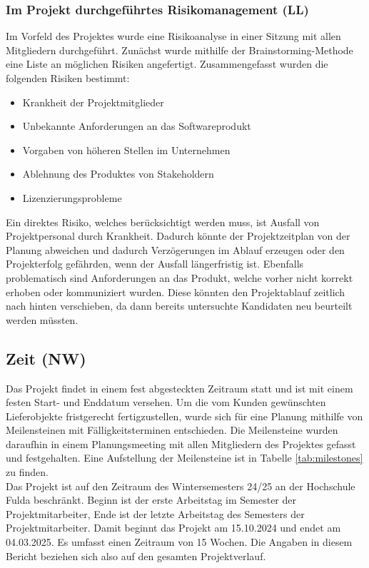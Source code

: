 \documentclass[ThesisDJ.tex]{subfiles}
\begin{document}
\subsubsection{Im Projekt durchgeführtes Risikomanagement (LL)}
Im Vorfeld des Projektes wurde eine Risikoanalyse in einer Sitzung mit allen Mitgliedern durchgeführt. Zunächst wurde mithilfe der Brainstorming-Methode eine Liste an möglichen Risiken angefertigt. Zusammengefasst wurden die folgenden Risiken bestimmt:

\begin{itemize}
    \item Krankheit der Projektmitglieder
    \item Unbekannte Anforderungen an das Softwareprodukt
    \item Vorgaben von höheren Stellen im Unternehmen
    \item Ablehnung des Produktes von Stakeholdern
    \item Lizenzierungsprobleme
\end{itemize}

Ein direktes Risiko, welches berücksichtigt werden muss, ist Ausfall von Projektpersonal durch Krankheit. Dadurch könnte der Projektzeitplan von der Planung abweichen und dadurch Verzögerungen im Ablauf erzeugen oder den Projekterfolg gefährden, wenn der Ausfall längerfristig ist. Ebenfalls problematisch sind Anforderungen an das Produkt, welche vorher nicht korrekt erhoben oder kommuniziert wurden. Diese könnten den Projektablauf zeitlich nach hinten verschieben, da dann bereits untersuchte Kandidaten neu beurteilt werden müssten.

\subsection{Zeit (NW)}
Das Projekt findet in einem fest abgesteckten Zeitraum statt und ist mit einem festen Start- und Enddatum versehen.
Um die vom Kunden gewünschten Lieferobjekte fristgerecht fertigzustellen, wurde sich für eine Planung mithilfe von Meilensteinen mit
Fälligkeitsterminen entschieden. Die Meilensteine wurden daraufhin in einem Planungsmeeting mit allen Mitgliedern des Projektes gefasst und festgehalten.
Eine Aufstellung der Meilensteine ist in Tabelle \ref{tab:milestones} zu finden.\\

Das Projekt ist auf den Zeitraum des Wintersemesters 24/25 an der Hochschule Fulda beschränkt.
Beginn ist der erste Arbeitstag im Semester der Projektmitarbeiter, Ende ist der letzte Arbeitstag des Semesters der Projektmitarbeiter. 
Damit beginnt das Projekt am 15.10.2024 und endet am 04.03.2025. Es umfasst einen Zeitraum von 15 Wochen. 
Die Angaben in diesem Bericht beziehen sich also auf den gesamten Projektverlauf.
\end{document}
